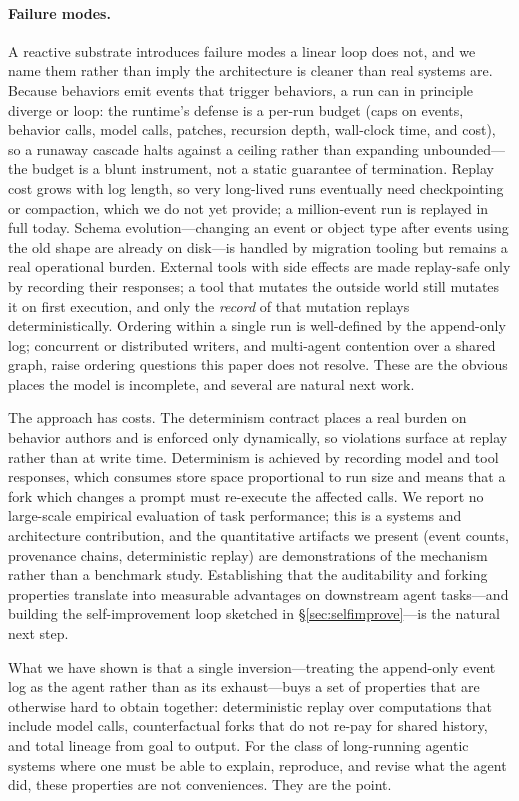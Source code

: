 \documentclass[11pt]{article}
\begin{document}
\paragraph{Failure modes.}
A reactive substrate introduces failure modes a linear loop does not, and we name
them rather than imply the architecture is cleaner than real systems are. Because
behaviors emit events that trigger behaviors, a run can in principle diverge or
loop: the runtime's defense is a per-run budget (caps on events, behavior calls,
model calls, patches, recursion depth, wall-clock time, and cost), so a runaway
cascade halts against a ceiling rather than expanding unbounded---the budget is a
blunt instrument, not a static guarantee of termination. Replay cost grows with log
length, so very long-lived runs eventually need checkpointing or compaction, which
we do not yet provide; a million-event run is replayed in full today. Schema
evolution---changing an event or object type after events using the old shape are
already on disk---is handled by migration tooling but remains a real operational
burden. External tools with side effects are made replay-safe only by recording
their responses; a tool that mutates the outside world still mutates it on first
execution, and only the \emph{record} of that mutation replays deterministically.
Ordering within a single run is well-defined by the append-only log; concurrent or
distributed writers, and multi-agent contention over a shared graph, raise ordering
questions this paper does not resolve. These are the obvious places the model is
incomplete, and several are natural next work.

The approach has costs. The determinism contract places a real burden on behavior
authors and is enforced only dynamically, so violations surface at replay rather
than at write time. Determinism is achieved by recording model and tool responses,
which consumes store space proportional to run size and means that a fork which
changes a prompt must re-execute the affected calls. We report no large-scale
empirical evaluation of task performance; this is a systems and architecture
contribution, and the quantitative artifacts we present (event counts, provenance
chains, deterministic replay) are demonstrations of the mechanism rather than a
benchmark study. Establishing that the auditability and forking properties
translate into measurable advantages on downstream agent tasks---and building the
self-improvement loop sketched in \S\ref{sec:selfimprove}---is the natural next step.

What we have shown is that a single inversion---treating the append-only event log
as the agent rather than as its exhaust---buys a set of properties that are
otherwise hard to obtain together: deterministic replay over computations that
include model calls, counterfactual forks that do not re-pay for shared history,
and total lineage from goal to output. For the class of long-running agentic
systems where one must be able to explain, reproduce, and revise what the agent
did, these properties are not conveniences. They are the point.
\end{document}
